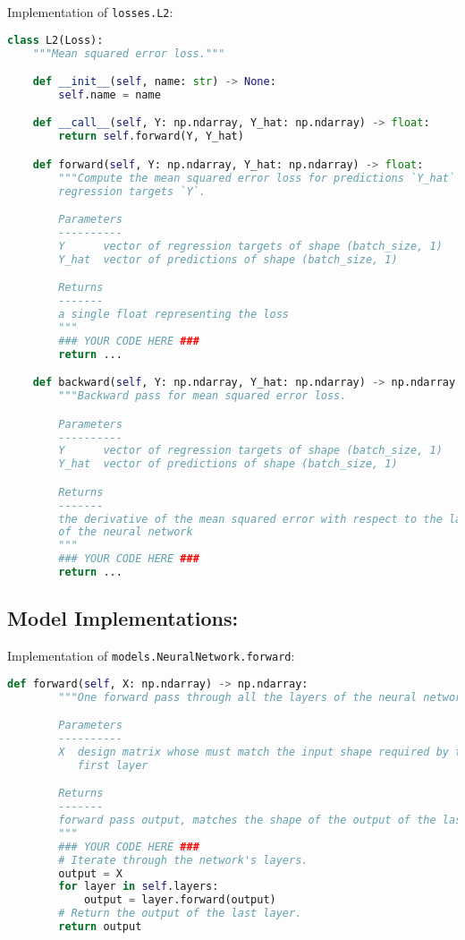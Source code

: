 Implementation of \texttt{losses.L2}:

\begin{lstlisting}[language=Python]
class L2(Loss):
    """Mean squared error loss."""

    def __init__(self, name: str) -> None:
        self.name = name

    def __call__(self, Y: np.ndarray, Y_hat: np.ndarray) -> float:
        return self.forward(Y, Y_hat)

    def forward(self, Y: np.ndarray, Y_hat: np.ndarray) -> float:
        """Compute the mean squared error loss for predictions `Y_hat` given
        regression targets `Y`.

        Parameters
        ----------
        Y      vector of regression targets of shape (batch_size, 1)
        Y_hat  vector of predictions of shape (batch_size, 1)

        Returns
        -------
        a single float representing the loss
        """
        ### YOUR CODE HERE ###
        return ...

    def backward(self, Y: np.ndarray, Y_hat: np.ndarray) -> np.ndarray:
        """Backward pass for mean squared error loss.

        Parameters
        ----------
        Y      vector of regression targets of shape (batch_size, 1)
        Y_hat  vector of predictions of shape (batch_size, 1)

        Returns
        -------
        the derivative of the mean squared error with respect to the last layer
        of the neural network
        """
        ### YOUR CODE HERE ###
        return ...

\end{lstlisting}


\subsection{Model Implementations:}

Implementation of \texttt{models.NeuralNetwork.forward}:

\begin{lstlisting}[language=Python]
    def forward(self, X: np.ndarray) -> np.ndarray:
        """One forward pass through all the layers of the neural network.

        Parameters
        ----------
        X  design matrix whose must match the input shape required by the
           first layer

        Returns
        -------
        forward pass output, matches the shape of the output of the last layer
        """
        ### YOUR CODE HERE ###
        # Iterate through the network's layers.
        output = X
        for layer in self.layers:
            output = layer.forward(output)
        # Return the output of the last layer.
        return output

\end{lstlisting}

